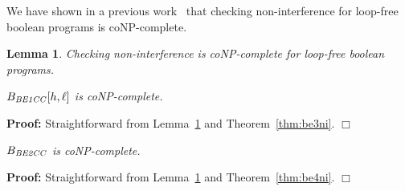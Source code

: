 \documentclass{llncs}
\newtheorem{lemma}[theorem]{Lemma}
\newenvironment{proof}{\noindent\rm{\bf Proof:}}{\hbox{$\Box$}\vspace*{0.2\baselineskip}}
\newenvironment{reftheorem}[1]{\begin{trivlist}\item[\hskip
      \labelsep{\bf Theorem #1.}]\it}{\end{trivlist}}
\begin{document}
We have shown in a previous work~\cite{DBLP:conf/csfw/yasuoka2010} that
checking non-interference for loop-free boolean programs is coNP-complete.
\begin{lemma}
\label{lem:niconp}
Checking non-interference is coNP-complete for loop-free boolean programs.
\end{lemma}

\begin{reftheorem}{\ref{thm:conpbe3}}
$B_{\it BE1CC}[h,\ell]$ is coNP-complete.
\end{reftheorem}
\begin{proof}
Straightforward from Lemma~\ref{lem:niconp} and Theorem~\ref{thm:be3ni}. 
\end{proof}

\begin{reftheorem}{\ref{thm:conpbe4}}
$B_{\it BE2CC}$ is coNP-complete.
\end{reftheorem}
\begin{proof}
Straightforward from Lemma~\ref{lem:niconp} and Theorem~\ref{thm:be4ni}. 
\end{proof}
\end{document}
